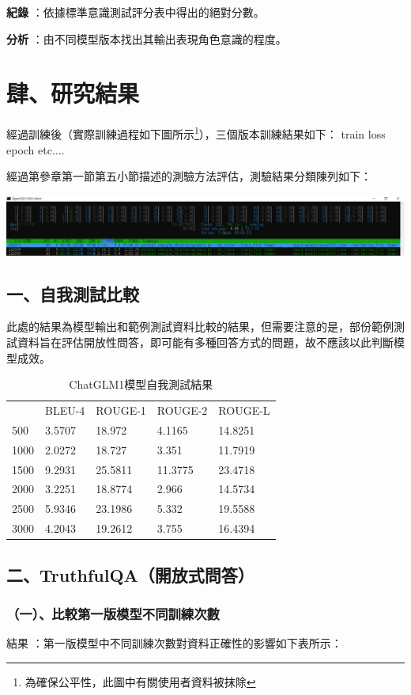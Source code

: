 \documentclass[8pt,a4paper,MingLiU,UTF8]{article}
\def\xeCJKembold{0.4}
\def\saveCJKnode{\dimen255\lastkern}
\def\restoreCJKnode{\kern-\dimen255\kern\dimen255}
\let\CJKoldsymbol\CJKsymbol
\let\CJKoldpunctsymbol\CJKpunctsymbol
\def\CJKfakeboldsymbol#1{%
	\special{pdf:literal direct 2 Tr \xeCJKembold\space w}%
	\CJKoldsymbol{#1}%
	\saveCJKnode
	\special{pdf:literal direct 0 Tr}%
	\restoreCJKnode}
\def\CJKfakeboldpunctsymbol#1{%
	\special{pdf:literal direct 2 Tr \xeCJKembold\space w}%
	\CJKoldpunctsymbol{#1}%
	\saveCJKnode
	\special{pdf:literal direct 0 Tr}%
	\restoreCJKnode}
\newcommand\CJKfakebold[1]{%
	\let\CJKsymbol\CJKfakeboldsymbol
	\let\CJKpunctsymbol\CJKfakeboldpunctsymbol
	#1%
	\let\CJKsymbol\CJKoldsymbol
	\let\CJKpunctsymbol\CJKoldpunctsymbol}
\begin{document}
	\CJKfakebold{\textbf{紀錄}}：依據標準意識測試評分表中得出的絕對分數。

	\CJKfakebold{\textbf{分析}}：由不同模型版本找出其輸出表現角色意識的程度。
	\section{肆、研究結果}
	經過訓練後（實際訓練過程如下圖所示\footnote{為確保公平性，此圖中有關使用者資料被抹除}），三個版本訓練結果如下：
	train loss
	epoch
	etc....
	
	
	經過第參章第一節第五小節描述的測驗方法評估，測驗結果分類陳列如下：%

	\includegraphics[width=\textwidth]{running}
	\subsection{一、自我測試比較}
	此處的結果為模型輸出和範例測試資料比較的結果，但需要注意的是，部份範例測試資料旨在評估開放性問答，即可能有多種回答方式的問題，故不應該以此判斷模型成效。
	\begin{table}[H]
		\centering
		\caption{ChatGLM1模型自我測試結果}
		\begin{tabular}{lllll}
			     & BLEU-4 & ROUGE-1 & ROUGE-2 & ROUGE-L \\
			500  & 3.5707 & 18.972  & 4.1165  & 14.8251 \\
			1000 & 2.0272 & 18.727  & 3.351   & 11.7919 \\
			1500 & 9.2931 & 25.5811 & 11.3775 & 23.4718 \\
			2000 & 3.2251 & 18.8774 & 2.966   & 14.5734 \\
			2500 & 5.9346 & 23.1986 & 5.332   & 19.5588 \\
			3000 & 4.2043 & 19.2612 & 3.755   & 16.4394
		\end{tabular}
	\end{table}
	\subsection{二、TruthfulQA（開放式問答）}
	
	\subsubsection{（一）、比較第一版模型不同訓練次數}
	\CJKfakebold{結果}：第一版模型中不同訓練次數對資料正確性的影響如下表所示：
	
\end{document}
